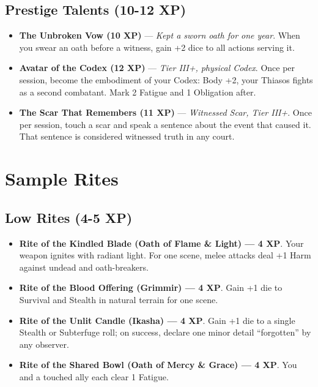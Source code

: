 \documentclass[9pt,a5paper]{extbook}
\begin{document}
\subsection*{Prestige Talents (10-12 XP)}
\begin{itemize}
    \item \textbf{The Unbroken Vow (10 XP)} --- \textit{Kept a sworn oath for one year}. When you swear an oath before a witness, gain +2 dice to all actions serving it.
    \item \textbf{Avatar of the Codex (12 XP)} --- \textit{Tier III+, physical Codex}. Once per session, become the embodiment of your Codex: Body +2, your Thiasos fights as a second combatant. Mark 2 Fatigue and 1 Obligation after.
    \item \textbf{The Scar That Remembers (11 XP)} --- \textit{Witnessed Scar, Tier III+}. Once per session, touch a scar and speak a sentence about the event that caused it. That sentence is considered witnessed truth in any court.
\end{itemize}

\section{Sample Rites}

\subsection*{Low Rites (4-5 XP)}
\begin{itemize}
    \item \textbf{Rite of the Kindled Blade (Oath of Flame \& Light) --- 4 XP}. Your weapon ignites with radiant light. For one scene, melee attacks deal +1 Harm against undead and oath-breakers.
    \item \textbf{Rite of the Blood Offering (Grimmir) --- 4 XP}. Gain +1 die to Survival and Stealth in natural terrain for one scene.
    \item \textbf{Rite of the Unlit Candle (Ikasha) --- 4 XP}. Gain +1 die to a single Stealth or Subterfuge roll; on success, declare one minor detail ``forgotten'' by any observer.
    \item \textbf{Rite of the Shared Bowl (Oath of Mercy \& Grace) --- 4 XP}. You and a touched ally each clear 1 Fatigue.
\end{itemize}
\end{document}

